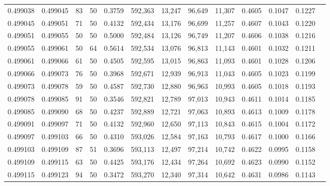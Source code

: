 \begin{tabular}{rrrrrrrrrrrrr}
0.499038 & 0.499045 &    83 &  50 &                                     0.3759 & 592,363 &  13,247 &  96,649 &  11,307 & 0.4605 & 0.1047 & 0.1227 \\
0.499045 & 0.499051 &    71 &  50 &                                     0.4132 & 592,434 &  13,176 &  96,699 &  11,257 & 0.4607 & 0.1043 & 0.1220 \\
0.499051 & 0.499055 &    50 &  50 &                                     0.5000 & 592,484 &  13,126 &  96,749 &  11,207 & 0.4606 & 0.1038 & 0.1216 \\
0.499055 & 0.499061 &    50 &  64 &                                     0.5614 & 592,534 &  13,076 &  96,813 &  11,143 & 0.4601 & 0.1032 & 0.1211 \\
0.499061 & 0.499066 &    61 &  50 &                                     0.4505 & 592,595 &  13,015 &  96,863 &  11,093 & 0.4601 & 0.1028 & 0.1206 \\
0.499066 & 0.499073 &    76 &  50 &                                     0.3968 & 592,671 &  12,939 &  96,913 &  11,043 & 0.4605 & 0.1023 & 0.1199 \\
0.499073 & 0.499078 &    59 &  50 &                                     0.4587 & 592,730 &  12,880 &  96,963 &  10,993 & 0.4605 & 0.1018 & 0.1193 \\
0.499078 & 0.499085 &    91 &  50 &                                     0.3546 & 592,821 &  12,789 &  97,013 &  10,943 & 0.4611 & 0.1014 & 0.1185 \\
0.499085 & 0.499090 &    68 &  50 &                                     0.4237 & 592,889 &  12,721 &  97,063 &  10,893 & 0.4613 & 0.1009 & 0.1178 \\
0.499091 & 0.499097 &    71 &  50 &                                     0.4132 & 592,960 &  12,650 &  97,113 &  10,843 & 0.4615 & 0.1004 & 0.1172 \\
0.499097 & 0.499103 &    66 &  50 &                                     0.4310 & 593,026 &  12,584 &  97,163 &  10,793 & 0.4617 & 0.1000 & 0.1166 \\
0.499103 & 0.499109 &    87 &  51 &                                     0.3696 & 593,113 &  12,497 &  97,214 &  10,742 & 0.4622 & 0.0995 & 0.1158 \\
0.499109 & 0.499115 &    63 &  50 &                                     0.4425 & 593,176 &  12,434 &  97,264 &  10,692 & 0.4623 & 0.0990 & 0.1152 \\
0.499115 & 0.499123 &    94 &  50 &                                     0.3472 & 593,270 &  12,340 &  97,314 &  10,642 & 0.4631 & 0.0986 & 0.1143 \\

\end{tabular}
